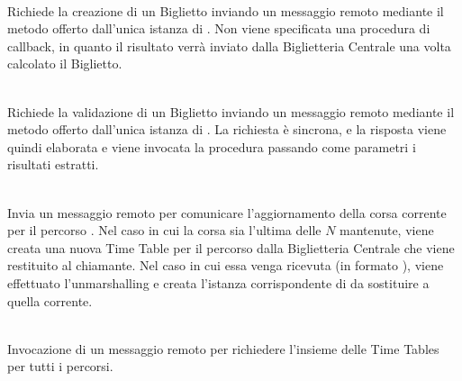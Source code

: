 		\begin{description}
			\item {} \\
			Richiede la creazione di un Biglietto inviando un messaggio remoto mediante il metodo  offerto dall'unica istanza di . Non viene specificata una procedura di callback, in quanto il risultato verrà inviato dalla Biglietteria Centrale una volta calcolato il Biglietto.
			
			\item {}\\
			Richiede la validazione di un Biglietto inviando un messaggio remoto mediante il metodo  offerto dall'unica istanza di . La richiesta è sincrona, e la risposta viene quindi elaborata e viene invocata la procedura  passando come parametri i risultati estratti.
			
			\item {}\\ 
			Invia un messaggio remoto per comunicare l'aggiornamento della corsa corrente  per il percorso . Nel caso in cui la corsa sia l'ultima delle $N$ mantenute, viene creata una nuova Time Table per il percorso  dalla Biglietteria Centrale che viene restituito al chiamante. Nel caso in cui essa venga ricevuta (in formato ), viene effettuato l'unmarshalling e creata l'istanza corrispondente di  da sostituire a quella corrente.
			
			\item {}\\
			Invocazione di un messaggio remoto per richiedere l'insieme delle Time Tables per tutti i percorsi.
				
		\end{description}
	
